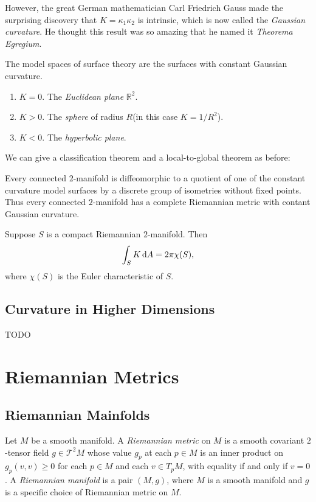 However, the great German mathematician Carl Friedrich Gauss made the surprising discovery that \( K = \kappa_1 \kappa_2 \) is intrinsic, which is now called the \emph{Gaussian curvature}.
He thought this result was so amazing that he named it \emph{Theorema Egregium}.

The model spaces of surface theory are the surfaces with constant Gaussian curvature.
\begin{enumerate}
  \item \( K = 0 \). The \emph{Euclidean plane} \( \mathbb{R}^2 \).
  \item \( K > 0 \). The \emph{sphere} of radius \( R \)(in this case \( K = 1 / R^2 \)).
  \item \( K < 0 \). The \emph{hyperbolic plane}.
\end{enumerate}
We can give a classification theorem and a local-to-global theorem as before:
\begin{theorem}
  \label{theorem-uniformation}
  Every connected \( 2 \)-manifold is diffeomorphic to a quotient of one of the constant curvature model surfaces by a discrete group of isometries without fixed points.
  Thus every connected \( 2 \)-manifold has a complete Riemannian metric with contant Gaussian curvature.
\end{theorem}

\begin{theorem}
  \label{theorem-Gauss-Bonnet}
  Suppose \( S \) is a compact Riemannian \( 2 \)-manifold.
  Then
  \[
    \int_S K \mathop{}\!\mathrm{d} A = 2 \pi \chi(S),
  \]
  where \( \chi(S) \) is the Euler characteristic of \( S \).
\end{theorem}

\subsection{Curvature in Higher Dimensions}
\label{subsection-curvature-in-higher-dimensions}
TODO %

\section{Riemannian Metrics}
\label{section-Riemannian-metrics}

\subsection{Riemannian Mainfolds}
\label{subsection-Riemannian-manifolds}

\begin{definition}
  \label{definition-Riemannian-metric}
  \label{definition-Riemannian-manifold}
  Let \( M \) be a smooth manifold.
  A \emph{Riemannian metric} on \( M \) is a smooth covariant \( 2 \)-tensor field \( g \in \mathcal{T}^2 M \) whose value \( g_p \) at each \( p \in M \) is an inner product on \( g_p(v, v) \geq 0 \) for each \( p \in M \) and each \( v \in T_p M \), with equality if and only if \( v = 0 \).
  A \emph{Riemannian manifold} is a pair \( (M, g) \), where \( M \) is a smooth manifold and \( g \) is a specific choice of Riemannian metric on \( M \).
\end{definition}

